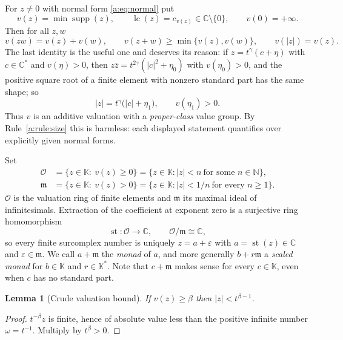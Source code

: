 \documentclass[11pt,a4paper]{article}
\numberwithin{equation}{section}
\newtheorem{lemma}[theorem]{Lemma}
\theoremstyle{definition}
\theoremstyle{remark}
\theoremstyle{plain}
\newcommand{\K}{\mathbb K}
\newcommand{\CC}{\mathbb C}
\newcommand{\NN}{\mathbb N}
\newcommand{\Ov}{\mathcal O}
\newcommand{\mm}{\mathfrak m}
\DeclareMathOperator{\supp}{supp}
\DeclareMathOperator{\st}{st}
\newcommand{\tm}{t}
\newcommand{\abs}[1]{\lvert #1\rvert}
\begin{document}
For $z\ne0$ with normal form \eqref{a:eq:normal} put
\[
 v(z)=\min\supp(z),\qquad
 \operatorname{lc}(z)=c_{v(z)}\in\CC\setminus\{0\},\qquad
 v(0)=+\infty .
\]
Then for all $z,w$
\begin{equation}\label{a:eq:valuation}
 v(zw)=v(z)+v(w),\qquad
 v(z+w)\ge\min\{v(z),v(w)\},\qquad
 v(\abs z)=v(z).
\end{equation}
The last identity is the useful one and deserves its reason: if
$z=\tm^{\gamma}(c+\eta)$ with $c\in\CC^{*}$ and $v(\eta)>0$, then
$z\bar z=\tm^{2\gamma}(\abs c^{2}+\eta_0)$ with $v(\eta_0)>0$, and the
positive square root of a finite element with nonzero standard part has
the same shape; so
\begin{equation}\label{a:eq:modulusleading}
 \abs z=\tm^{\gamma}\bigl(\abs c+\eta_1\bigr),\qquad v(\eta_1)>0 .
\end{equation}
Thus $v$ is an additive valuation with a \emph{proper-class} value
group.  By Rule~\ref{a:rule:size} this is harmless: each displayed
statement quantifies over explicitly given normal forms.

Set
\begin{align*}
 \Ov&=\{z\in\K:\ v(z)\ge0\}
     =\{z\in\K:\abs z<n\ \text{for some } n\in\NN\},\\
 \mm&=\{z\in\K:\ v(z)>0\}
     =\{z\in\K:\abs z<1/n\ \text{for every } n\ge1\}.
\end{align*}
$\Ov$ is the valuation ring of finite elements and $\mm$ its maximal
ideal of infinitesimals.  Extraction of the coefficient at exponent
zero is a surjective ring homomorphism
\begin{equation}\label{a:eq:st}
 \st:\Ov\longrightarrow\CC,\qquad \Ov/\mm\cong\CC ,
\end{equation}
so every finite surcomplex number is uniquely $z=a+\varepsilon$ with
$a=\st(z)\in\CC$ and $\varepsilon\in\mm$.  We call $a+\mm$ the
\emph{monad} of $a$, and more generally $b+r\mm$ a \emph{scaled monad}
for $b\in\K$ and $r\in\K^{*}$.  Note that $c+\mm$ makes sense for every
$c\in\K$, even when $c$ has no standard part.

\begin{lemma}[Crude valuation bound]\label{a:lem:valbound}
If $v(z)\ge\beta$ then $\abs z<\tm^{\beta-1}$.
\end{lemma}

\begin{proof}
$\tm^{-\beta}z$ is finite, hence of absolute value less than the
positive infinite number $\omega=\tm^{-1}$.  Multiply by
$\tm^{\beta}>0$.
\end{proof}
\end{document}
